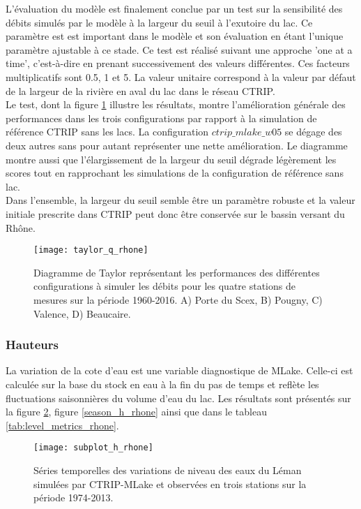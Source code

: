 L'évaluation du modèle est finalement conclue par un test sur la sensibilité des débits simulés par le modèle à la largeur du seuil à l'exutoire du lac. Ce paramètre est est important dans le modèle et son évaluation en étant l'unique paramètre ajustable à ce stade. Ce test est réalisé suivant une approche 'one at a time', c'est-à-dire en prenant successivement des valeurs différentes. Ces facteurs multiplicatifs sont 0.5, 1 et 5. La valeur unitaire correspond à la valeur par défaut de la largeur de la rivière en aval du lac dans le réseau CTRIP.\\
Le test, dont la figure \ref{taylor_q_rhone} illustre les résultats, montre l'amélioration générale des performances dans les trois configurations par rapport à la simulation de référence CTRIP sans les lacs. La configuration $ctrip\_mlake\_w05$ se dégage des deux autres sans pour autant représenter une nette amélioration. Le diagramme montre aussi que l'élargissement de la largeur du seuil dégrade légèrement les scores tout en rapprochant les simulations de la configuration de référence sans lac.\\
Dans l'ensemble, la largeur du seuil semble être un paramètre robuste et la valeur initiale prescrite dans CTRIP peut donc être conservée sur le bassin versant du Rhône.

\begin{figure}[h!]
\centering
\texttt{[image: taylor\_q\_rhone]}
\caption{Diagramme de Taylor représentant les performances des différentes configurations à simuler les débits pour les quatre stations de mesures sur la période 1960-2016. A) Porte du Scex, B) Pougny, C) Valence, D) Beaucaire.}
\label{taylor_q_rhone}
\end{figure}
\clearpage
\subsubsection*{{\selectfont Hauteurs}}

La variation de la cote d'eau est une variable diagnostique de MLake. Celle-ci est calculée sur la base du stock en eau à la fin du pas de temps et reflète les fluctuations saisonnières du volume d'eau du lac. Les résultats sont présentés sur la figure \ref{subplot_h_rhone}, figure \ref{season_h_rhone} ainsi que dans le tableau \ref{tab:level_metrics_rhone}.\\

\begin{figure}[h!]
\texttt{[image: subplot\_h\_rhone]}
\caption{Séries temporelles des variations de niveau des eaux du Léman simulées par CTRIP-MLake et observées en trois stations sur la période 1974-2013.}
\label{subplot_h_rhone}
\end{figure}


